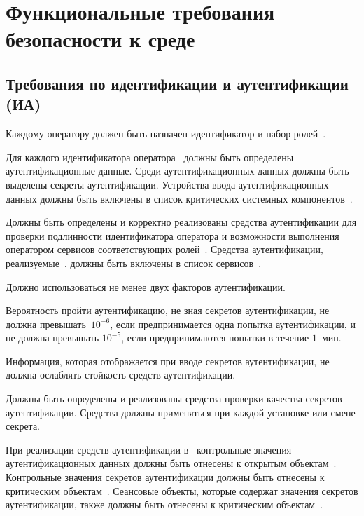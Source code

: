 \chapter{Функциональные требования безопасности к среде}\label{FReqsEnv}

\section{Требования по идентификации и аутентификации (ИА)}

\label{Identification}
Каждому оператору должен быть назначен идентификатор и набор 
ролей~.

\label{AuthData}
Для каждого идентификатора оператора~
должны быть определены аутентификационные данные. 
Среди аутентификационных данных должны быть выделены 
секреты аутентификации.
%
Устройства ввода аутентификационных данных 
должны быть включены в список критических системных 
компонентов~.

\label{Authentication}
Должны быть определены и корректно реализованы средства 
аутентификации для проверки 
подлинности идентификатора оператора и возможности выполнения 
оператором сервисов соответствующих ролей~.
%
Средства аутентификации, реализуемые~\TOE, 
должны быть включены в список сервисов~.

\label{Auth2Factor}
Должно использоваться не менее двух факторов аутентификации.

\label{AuthStrength}
Вероятность пройти аутентификацию, 
не зная секретов аутентификации, 
не должна превышать~$10^{-6}$, 
если предпринимается одна попытка аутентификации, 
и не должна превышать $10^{-5}$, 
если предпринимаются попытки в течение $1$~мин.

\label{PwdMask}
Информация, которая отображается при вводе секретов аутентификации, 
не должна ослаблять стойкость средств аутентификации.

\label{PwdSet}
Должны быть определены и реализованы средства проверки качества 
секретов аутентификации. 
Средства должны применяться при каждой установке или смене секрета.

\label{AuthSecrets}
При реализации средств аутентификации в~\TOE
контрольные значения аутентификационных данных 
должны быть отнесены к открытым объектам~.
Контрольные значения секретов аутентификации
должны быть отнесены к критическим объектам~.
Сеансовые объекты, которые содержат значения секретов аутентификации,
также должны быть отнесены к критическим объектам~.

